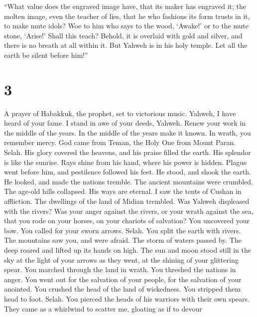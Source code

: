  ``What value does the engraved image have, that its maker
has engraved it; the molten image, even the teacher of lies, that he who
fashions its form trusts in it, to make mute idols?  Woe to
him who says to the wood, `Awake!' or to the mute stone, `Arise!' Shall
this teach? Behold, it is overlaid with gold and silver, and there is no
breath at all within it.  But Yahweh is in his holy temple.
Let all the earth be silent before him!''

\hypertarget{section-2}{%
\section{3}\label{section-2}}

 A prayer of Habakkuk, the prophet, set to victorious music.
 Yahweh, I have heard of your fame. I stand in awe of your
deeds, Yahweh. Renew your work in the middle of the years. In the middle
of the years make it known. In wrath, you remember mercy. 
God came from Teman, the Holy One from Mount Paran. Selah. His glory
covered the heavens, and his praise filled the earth.  His
splendor is like the sunrise. Rays shine from his hand, where his power
is hidden.  Plague went before him, and pestilence followed
his feet.  He stood, and shook the earth. He looked, and
made the nations tremble. The ancient mountains were crumbled. The
age-old hills collapsed. His ways are eternal.  I saw the
tents of Cushan in affliction. The dwellings of the land of Midian
trembled.  Was Yahweh displeased with the rivers? Was your
anger against the rivers, or your wrath against the sea, that you rode
on your horses, on your chariots of salvation?  You
uncovered your bow. You called for your sworn arrows. Selah. You split
the earth with rivers.  The mountains saw you, and were
afraid. The storm of waters passed by. The deep roared and lifted up its
hands on high.  The sun and moon stood still in the sky at
the light of your arrows as they went, at the shining of your glittering
spear.  You marched through the land in wrath. You threshed
the nations in anger.  You went out for the salvation of
your people, for the salvation of your anointed. You crushed the head of
the land of wickedness. You stripped them head to foot. Selah.
 You pierced the heads of his warriors with their own
spears. They came as a whirlwind to scatter me, gloating as if to devour
